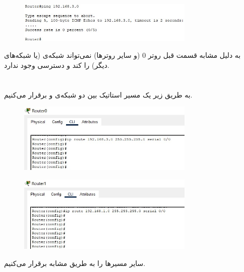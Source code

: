 \documentclass{article}
\begin{document}
\section{}%
\begin{figure}[H]
    \centering
    \includegraphics[width=0.75\textwidth]{figures/14.jpg}
    \caption{}
    \label{fig:fig1}
\end{figure}
به دلیل مشابه قسمت قبل روتر 0 (و سایر روترها) نمی‌تواند شبکه‌ی  (یا شبکه‌های دیگر) را  کند و دسترسی وجود ندارد.

\section{}%
به طریق زیر یک مسیر استاتیک بین دو شبکه‌ی  و   برقرار می‌کنیم.
\begin{figure}[H]
    \centering
    \includegraphics[width=0.75\textwidth]{figures/15.jpg}
    \caption{}
    \label{fig:fig1}
\end{figure}
\begin{figure}[H]
    \centering
    \includegraphics[width=0.75\textwidth]{figures/16.jpg}
    \caption{}
    \label{fig:fig1}
\end{figure}
سایر مسیرها را به طریق مشابه برقرار می‌کنیم.
\end{document}
